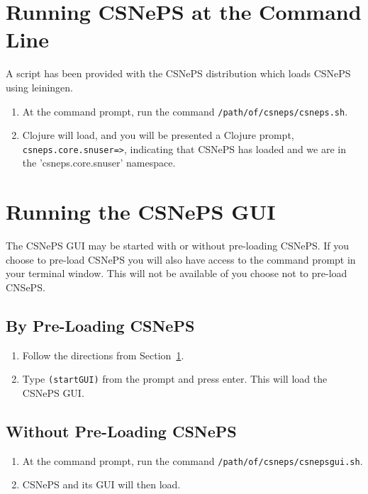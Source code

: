 \documentclass[letterpaper,colorlinks=true,linkcolor=blue]{book}
\begin{document}
\section{Running CSNePS at the Command Line}\label{sec:loadcmd}

A script has been provided with the CSNePS distribution which loads CSNePS using leiningen.

\begin{enumerate}
  \item At the command prompt, run the command \texttt{/path/of/csneps/csneps.sh}.
  \item Clojure will load, and you will be presented a 
  Clojure prompt, \texttt{csneps.core.snuser=>}, indicating that CSNePS has loaded and we are in the 'csneps.core.snuser' namespace.
\end{enumerate}

\section{Running the CSNePS GUI}

The CSNePS GUI may be started with or without pre-loading CSNePS. If you choose to pre-load CSNePS you will also have access to the command prompt in your terminal window. This will not be available of you choose not to pre-load CNSePS. 

\subsection{By Pre-Loading CSNePS}

\begin{enumerate}
  \item Follow the directions from Section~\ref{sec:loadcmd}.
  \item Type \texttt{(startGUI)} from the prompt and press enter. This will load the CSNePS GUI.
\end{enumerate}

\subsection{Without Pre-Loading CSNePS}

\begin{enumerate}
  \item At the command prompt, run the command \texttt{/path/of/csneps/csnepsgui.sh}.
  \item CSNePS and its GUI will then load.
\end{enumerate}
\end{document}

